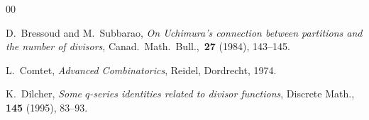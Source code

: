 \documentclass[11pt,reqno]{amsart}
\renewcommand{\(}{\left\(}
\renewcommand{\)}{\right\)}
\renewcommand{\[}{\left\[}
\renewcommand{\]}{\right\]}
\numberwithin{equation}{section}
\theoremstyle{plain}
\begin{document}
\begin{thebibliography}{00}
 
 
 
 
 
 D.~Bressoud and M.~Subbarao, \emph{On Uchimura's connection between partitions and the number of divisors}, Canad.~Math.~Bull.,~\textbf{27} (1984), 143--145.
 
 
 L.~Comtet, \emph{Advanced Combinatorics},  Reidel, Dordrecht, 1974.
 
 
K.~Dilcher, \emph{Some $q$-series identities related to divisor functions}, Discrete Math., {\bf 145} (1995), 83--93.  
 
 


 

\end{thebibliography}
\end{document}
